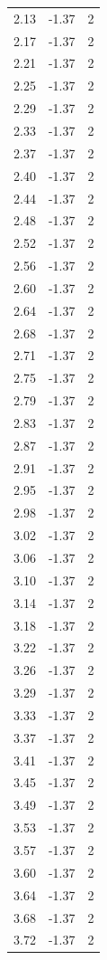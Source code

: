 \begin{longtable}{lrr}
  2.13 & -1.37 & 2 \\
  2.17 & -1.37 & 2 \\
  2.21 & -1.37 & 2 \\
  2.25 & -1.37 & 2 \\
  2.29 & -1.37 & 2 \\
  2.33 & -1.37 & 2 \\
  2.37 & -1.37 & 2 \\
  2.40 & -1.37 & 2 \\
  2.44 & -1.37 & 2 \\
  2.48 & -1.37 & 2 \\
  2.52 & -1.37 & 2 \\
  2.56 & -1.37 & 2 \\
  2.60 & -1.37 & 2 \\
  2.64 & -1.37 & 2 \\
  2.68 & -1.37 & 2 \\
  2.71 & -1.37 & 2 \\
  2.75 & -1.37 & 2 \\
  2.79 & -1.37 & 2 \\
  2.83 & -1.37 & 2 \\
  2.87 & -1.37 & 2 \\
  2.91 & -1.37 & 2 \\
  2.95 & -1.37 & 2 \\
  2.98 & -1.37 & 2 \\
  3.02 & -1.37 & 2 \\
  3.06 & -1.37 & 2 \\
  3.10 & -1.37 & 2 \\
  3.14 & -1.37 & 2 \\
  3.18 & -1.37 & 2 \\
  3.22 & -1.37 & 2 \\
  3.26 & -1.37 & 2 \\
  3.29 & -1.37 & 2 \\
  3.33 & -1.37 & 2 \\
  3.37 & -1.37 & 2 \\
  3.41 & -1.37 & 2 \\
  3.45 & -1.37 & 2 \\
  3.49 & -1.37 & 2 \\
  3.53 & -1.37 & 2 \\
  3.57 & -1.37 & 2 \\
  3.60 & -1.37 & 2 \\
  3.64 & -1.37 & 2 \\
  3.68 & -1.37 & 2 \\
  3.72 & -1.37 & 2 \\

\end{longtable}
